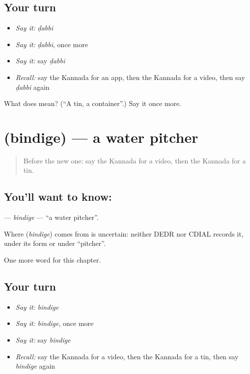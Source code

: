 \subsection*{Your turn}
\begin{itemize}
\raggedright
  \item \emph{Say it:} \emph{ḍabbi}
  \item \emph{Say it:} \emph{ḍabbi}, once more
  \item \emph{Say it:} say \emph{ḍabbi}
  \item \emph{Recall:} say the Kannada for an app, then the Kannada for a video, then say \emph{ḍabbi} again
\end{itemize}

\begin{tcolorbox}[breakable,colback=teal!4,colframe=teal!35!black,title={Before you move on}]
What does  mean? (\textquotedblleft{}A tin, a container\textquotedblright{}.) Say it once more.
\end{tcolorbox}
\section[\texorpdfstring{\kn{ಬಿಂದಿಗೆ} (bindige)}{ಬಿಂದಿಗೆ (bindige)}]{ (bindige) — a water pitcher}

\label{lesson:KA-C265-bindige}



\begin{quote}
Before the new one: say the Kannada for a video, then the Kannada for a tin.
\end{quote}

\subsection*{You'll want to know: }
\textbf{} — \emph{bindige} — \textquotedblleft{}a water pitcher\textquotedblright{}.

\begin{cousinweb}
Where \textbf{} (\emph{bindige}) comes from is uncertain: neither DEDR nor CDIAL records it, under its form or under \textquotedblleft{}pitcher\textquotedblright{}.
\end{cousinweb}

\begin{grammarlens}[title={What you've built}]
One more word for this chapter.
\end{grammarlens}

\subsection*{Your turn}
\begin{itemize}
\raggedright
  \item \emph{Say it:} \emph{bindige}
  \item \emph{Say it:} \emph{bindige}, once more
  \item \emph{Say it:} say \emph{bindige}
  \item \emph{Recall:} say the Kannada for a video, then the Kannada for a tin, then say \emph{bindige} again
\end{itemize}

